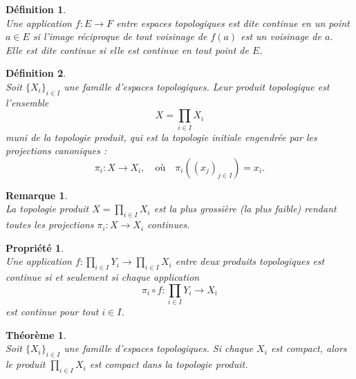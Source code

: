 \documentclass[a4paper, 14pt]{report}
\newtheorem{definition}{Définition}[section]
\newtheorem{remark}{Remarque}[section]
\newtheorem{propriety}{Propriété}[section]
\newtheorem{theorem}{Théorème}[section]
\begin{document}
\begin{onehalfspace}
{			
			\begin{definition} \cite{bourbaki2013general} \\
				Une application \( f : E \to F \) entre espaces topologiques est dite \textit{continue en un point} \( a \in E \) si l'image réciproque de tout voisinage de \( f(a) \) est un voisinage de \( a \).\\
				Elle est dite \textit{continue} si elle est continue en tout point de \( E \).
			\end{definition}
			
			
			\begin{definition} \cite{bourbaki2013general}\\
				Soit \(\{X_i\}_{i \in I}\) une famille d'espaces topologiques. Leur produit topologique est l'ensemble  
				\[
				X = \prod_{i \in I} X_i
				\]
				muni de la topologie produit, qui est la topologie initiale engendrée par les projections canoniques :
				\[
				\pi_i : X \to X_i, \quad \text{où} \quad \pi_i((x_j)_{j \in I}) = x_i.
				\]
			\end{definition}
			
			\begin{remark} \cite{bourbaki2013general}\\
				La topologie produit \(X = \prod_{i \in I} X_i \) est la plus grossière (la plus faible) rendant toutes les projections \(\pi_i : X \to X_i\) continues.
			\end{remark}
			
			\begin{propriety}  \cite{bourbaki2013general}\\
				Une application \( f:  \prod_{i \in I} Y_i \to \prod_{i \in I} X_i \) entre deux produits topologiques est continue si et seulement si chaque application  
				\[
				\pi_i \circ f: \prod_{i \in I} Y_i \to X_i
				\]
				est continue pour tout \( i \in I \).
			\end{propriety}
			
			\begin{theorem}	\cite{bourbaki2013general}\\
				Soit \( \{ X_i \}_{i \in I} \) une famille d'espaces topologiques. Si chaque \( X_i \) est compact, alors le produit \( \prod_{i \in I} X_i \) est compact dans la topologie produit.	
			\end{theorem}
			
}
\end{onehalfspace}
\end{document}
